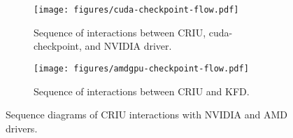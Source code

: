 \begin{figure*}[t]
    \centering
    \begin{subfigure}[]{0.45\textwidth}
        \centering
        \texttt{[image: figures/cuda-checkpoint-flow.pdf]}
        \caption{Sequence of interactions between CRIU, cuda-checkpoint, and NVIDIA driver.}
        \label{fig:cuda-checkpoint-flow}
    \end{subfigure}
    \hspace{0.95em}
    \hspace{0.05em}
    \begin{subfigure}[]{0.45\textwidth}
        \centering
        \texttt{[image: figures/amdgpu-checkpoint-flow.pdf]}
        \caption{Sequence of interactions between CRIU and KFD.}
        \label{fig:amdgpu-checkpoint-flow}
    \end{subfigure}
    \vspace{-0.5em}
    \caption{Sequence diagrams of CRIU interactions with NVIDIA and AMD drivers.}
    \label{fig:plugins-checkpoint-workflow}
    \vspace{-1em}
\end{figure*}